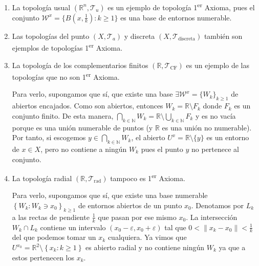 \begin{ej}
\begin{enumerate}
    \item La topología usual $(\mathbb{R}^n, \mathcal{T}_u)$ es un ejemplo de topología 1\textsuperscript{er} Axioma, pues el conjunto $\mathcal{W}^x = \{B\left( x, \frac{1}{k} \right): k \ge 1\}$ es una base de entornos numerable.
    
    \item Las topologías del punto $\left( X, \mathcal{T}_a \right)$ y discreta $\left( X, \mathcal{T}_{\text{discreta}} \right)$ también son ejemplos de topologías 1\textsuperscript{er} Axioma.

    \item La topología de los complementarios finitos $\left( \mathbb{R}, \mathcal{T}_{\text{CF}} \right)$ es un ejemplo de las topologías que no son 1\textsuperscript{er} Axioma.
    
    Para verlo, supongamos que sí, que existe una base $\exists \mathcal{W}^x = \{W_k\}_{k \ge 1}$ de abiertos encajados. Como son abiertos, entonces $W_k = \mathbb{R} \setminus F_k$ donde $F_k$ es un conjunto finito. De esta manera, $\bigcap_{k \in \mathbb{N}} W_k = \mathbb{R} \setminus \bigcup_{k \in \mathbb{N}} F_k$ y es no vacía porque es una unión numerable de puntos (y $\mathbb{R}$ es una unión no numerable). Por tanto, si escogemos $y \in \bigcap_{k \in \mathbb{N}} W_k$, el abierto $U^x = \mathbb{R}\setminus \{y\}$ es un entorno de $x\in X$, pero no contiene a ningún $W_k$ pues el punto $y$ no pertenece al conjunto.
    
    \item La topología radial $\left( \mathbb{R}, \mathcal{T}_{\text{rad}} \right)$ tampoco es 1\textsuperscript{er} Axioma.
    
    Para verlo, supongamos que sí, que existe una base numerable $\left\{ W_k : W_k \ni x_0 \right\}_{k \ge 1}$ de entornos abiertos de un punto $x_0$. Denotamos por $L_k$ a las rectas de pendiente $\frac{1}{k}$ que pasan por ese mismo $x_0$. La intersección $W_k \cap L_k$ contiene un intervalo $\left( x_0 - \varepsilon, x_0 + \varepsilon \right)$ tal que $0 < \lVert x_k - x_0 \rVert < \frac{1}{k}$ del que podemos tomar un $x_k$ cualquiera. Ya vimos que $U^{x_0} = \mathbb{R}^2 \setminus \left\{ x_k: k \ge 1 \right\}$ es abierto radial y no contiene ningún $W_k$ ya que a estos pertenecen los $x_k$.
\end{enumerate}
\end{ej}

